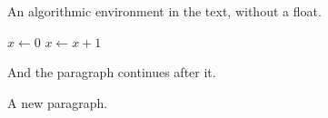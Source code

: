 \documentclass{article}
\begin{document}
An algorithmic environment in the text, without a float.
\begin{algorithmic}[1]
\STATE $x \gets 0$
\STATE $x \gets x + 1$
\ENDWHILE
\end{algorithmic}
And the paragraph continues after it.

A new paragraph.
\end{document}
